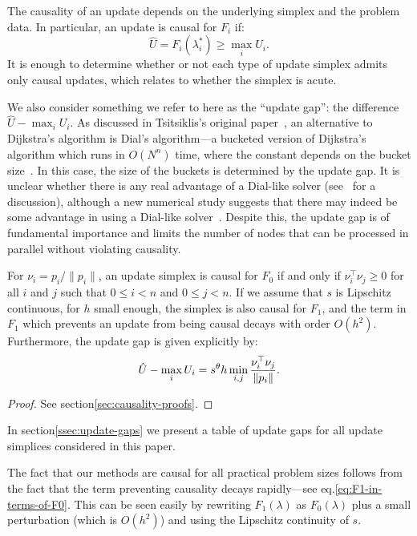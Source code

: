 \documentclass[smallcondensed]{svjour3}
\begin{document}
The causality of an update depends on the underlying simplex and the
problem data. In particular, an update is causal for $F_i$ if:
\begin{equation}
  \hat{U} = F_i(\lambda_i^*) \geq \max_i U_i.
\end{equation}
It is enough to determine whether or not each type of update simplex
admits only causal updates, which relates to whether the simplex is
acute.

We also consider something we refer to here as the ``update gap'': the
difference $\hat{U} - \max_i U_i$. As discussed in Tsitsiklis's
original paper~\cite{tsitsiklis1995efficient}, an alternative to
Dijkstra's algorithm is Dial's algorithm---a bucketed version of
Dijkstra's algorithm which runs in $O(N^n)$ time, where the constant
depends on the bucket size~\cite{dial1969algorithm,kim2001calo}. In
this case, the size of the buckets is determined by the update gap. It
is unclear whether there is any real advantage of a Dial-like solver
(see~\cite{jeong2008fast} for a discussion), although a new numerical
study suggests that there may indeed be some advantage in using a
Dial-like solver~\cite{kim2001calo,gomez2019fast}. Despite this, the
update gap is of fundamental importance and limits the number of nodes
that can be processed in parallel without violating causality.

\begin{theorem}\label{thm:causality}
  For $\nu_i = p_i/\|p_i\|$, an update simplex is causal for $F_0$ if
  and only if $\nu_i^\top \nu_j \geq 0$ for all $i$ and $j$ such that
  $0 \leq i < n$ and $0 \leq j < n$. If we assume that $s$ is
  Lipschitz continuous, for $h$ small enough, the simplex is also
  causal for $F_1$, and the term in $F_1$ which prevents an update
  from being causal decays with order $O(h^2)$. Furthermore, the
  update gap is given explicitly by:
  \begin{equation}
    \hat{U} - \max_i U_i = s^\theta h \min_{i, j} \frac{\nu_i^\top \nu_j}{\left\|p_i\right\|}.
  \end{equation}
\end{theorem}

\begin{proof}
  See section\@ \ref{sec:causality-proofs}.
\end{proof}

In section\@ \ref{ssec:update-gaps} we present a table of update gaps
for all update simplices considered in this paper.

The fact that our methods are causal for all practical problem sizes
follows from the fact that the term preventing causality decays
rapidly---see eq.\@ \ref{eq:F1-in-terms-of-F0}. This can be seen
easily by rewriting $F_1(\lambda)$ as $F_0(\lambda)$ plus a small
perturbation (which is $O(h^2)$) and using the Lipschitz continuity of
$s$.
\end{document}
